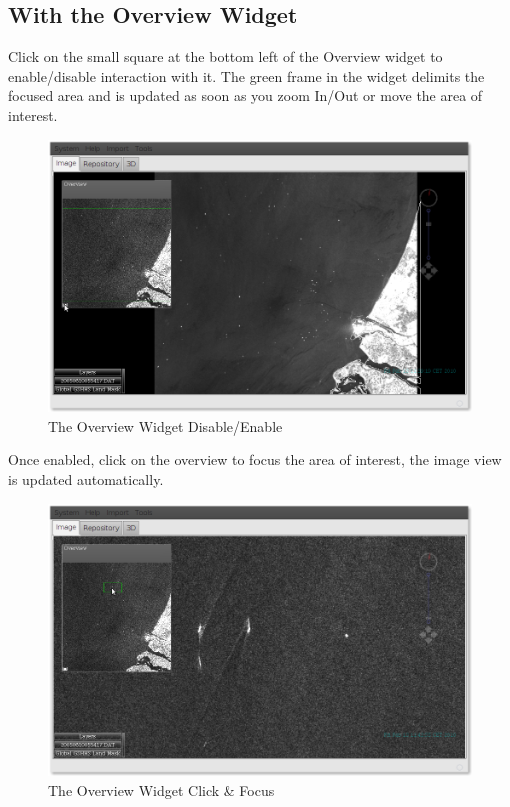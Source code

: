\documentclass[12pt,a4paper,final]{report}
\begin{document}
\subsection{With the Overview Widget}
Click on the small square at the bottom left of the Overview widget to enable/disable interaction with it.
The green frame in the widget delimits the focused area and is updated as soon as you zoom In/Out or move the area of interest.
\begin{figure}[H]
 \centering
 \includegraphics[scale=0.45,keepaspectratio=true]{./images/OverviewNavigation.png}
 \caption{The Overview Widget Disable/Enable}
\end{figure}

Once enabled, click on the overview to focus the area of interest, the image view is updated automatically.

\begin{figure}[H]
 \centering
 \includegraphics[scale=0.45,keepaspectratio=true]{./images/OverviewNavigation2.png}
 \caption{The Overview Widget Click \& Focus}
\end{figure}
\end{document}
